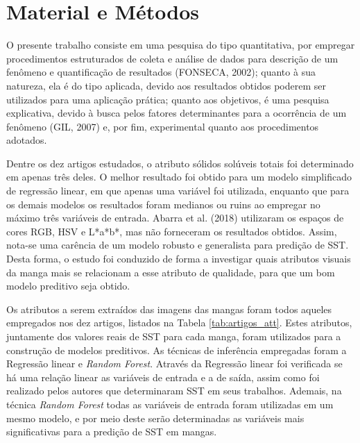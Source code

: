 \chapter{Material e Métodos} \label{ch:MM} %

O presente trabalho consiste em uma pesquisa do tipo quantitativa, por empregar procedimentos estruturados de coleta e análise de dados para descrição de um fenômeno e quantificação de resultados (FONSECA, 2002); quanto à sua natureza, ela é do tipo aplicada, devido aos resultados obtidos poderem ser utilizados para uma aplicação prática; quanto aos objetivos, é uma pesquisa explicativa, devido à busca pelos fatores determinantes para a ocorrência de um fenômeno (GIL, 2007) e, por fim, experimental quanto aos procedimentos adotados. 

Dentre os dez artigos estudados, o atributo sólidos solúveis totais foi determinado em apenas três deles. O melhor resultado foi obtido para um modelo simplificado de regressão linear, em que apenas uma variável foi utilizada, enquanto que para os demais modelos os resultados foram medianos ou ruins ao empregar no máximo três variáveis de entrada. Abarra et al. (2018) utilizaram os espaços de cores RGB, HSV e L*a*b*, mas não forneceram os resultados obtidos. Assim, nota-se uma carência de um modelo robusto e generalista para predição de SST. Desta forma, o estudo foi conduzido de forma a investigar quais atributos visuais da manga mais se relacionam a esse atributo de qualidade, para que um bom modelo preditivo seja obtido.

Os atributos a serem extraídos das imagens das mangas foram todos aqueles empregados nos dez artigos, listados na Tabela \ref{tab:artigos_att}. Estes atributos, juntamente dos valores reais de SST para cada manga, foram utilizados para a construção de modelos preditivos. As técnicas de inferência empregadas foram a Regressão linear e \textit{Random Forest}. Através da Regressão linear foi verificada se há uma relação linear as variáveis de entrada e a de saída, assim como foi realizado pelos autores que determinaram SST em seus trabalhos. Ademais, na técnica \textit{Random Forest} todas as variáveis de entrada foram utilizadas em um mesmo modelo, e por meio deste serão determinadas as variáveis mais significativas para a predição de SST em mangas. 

